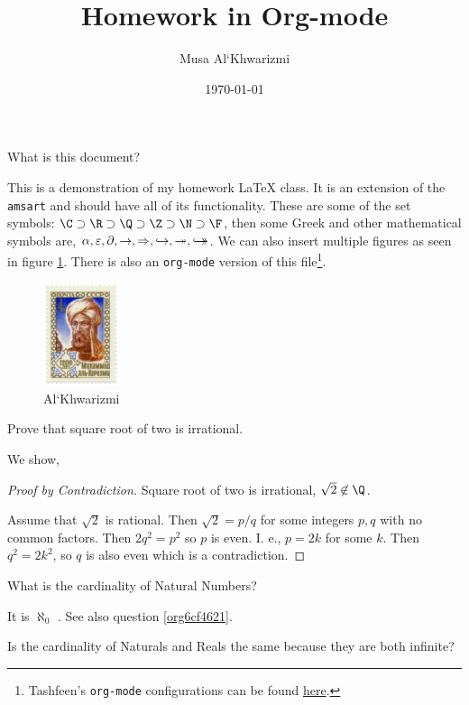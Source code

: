 \documentclass{homework}
\author{Musa Al`Khwarizmi}
\date{\today}
\title{Homework in Org-mode}
\begin{document}
\maketitle

\question What is this document?
\label{sec:org52d976a}

This is a demonstration of my homework \LaTeX{} class. It is an extension of the \texttt{amsart} and should have all of its functionality. These are some of the set symbols: \(\C \supset \R \supset \Q \supset \Z \supset \N \supset \F\), then some Greek and other mathematical symbols are, \(\alpha, \varepsilon, \partial, \rightarrow, \Rightarrow, \hookrightarrow, \twoheadrightarrow, \hookrightarrow\mathrel{\mspace{-15mu}}\rightarrow\). We can also insert multiple figures as seen in figure \ref{fig:org61ffa11}. There is also an \texttt{org-mode} version of this file\footnote{Tashfeen's \texttt{org-mode} configurations can be found \href{https://github.com/simurgh9/emacs786}{here}.}.

\begin{figure}[htbp]
\centering
\includegraphics[width=0.2\textwidth]{../../media/khwarizmi.png}
\caption{\label{fig:org61ffa11}Al`Khwarizmi}
\end{figure}

\question Prove that square root of two is irrational.
\label{sec:org0ec0cfc}

We show,
\begin{proof}[Proof by Contradiction]
Square root of two is irrational, \(\sqrt{2} \not\in \Q\).

Assume that \(\sqrt{2}\) is rational. Then \(\sqrt{2} = p/q\) for some integers \(p,q\) with no common factors. Then \(2q^2 = p^2\) so \(p\) is even. I. e., \(p=2k\) for some \(k\). Then \(q^2=2k^2\), so \(q\) is also even which is a contradiction.
\end{proof}

\question What is the cardinality of Natural Numbers?
\label{sec:org4db6b29}
\label{orgadc0224}

It is \(\aleph_0\) \cite{arlinghaus1996part}. See also question \ref{org6cf4621}.

\question [IV] Is the cardinality of Naturals and Reals the same because they are both infinite?
\label{sec:org3b68e58}
\label{org6cf4621}
\end{document}
